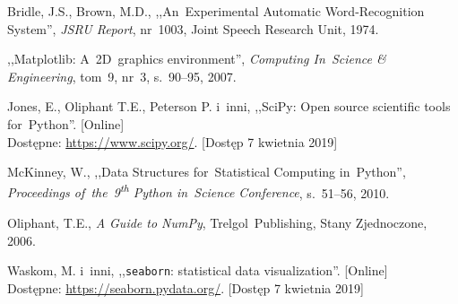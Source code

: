 \documentclass[11pt,a4paper]{article}
\begin{document}
\begin{thebibliography}{9}

        Bridle, J.S.,
        Brown, M.D.,
        ,,An~Experimental Automatic Word-Recognition System'',
        \emph{JSRU Report},
        nr~1003,
        Joint Speech Research Unit,
        1974.

        ,,Matplotlib: A~2D~graphics environment'',
        \emph{Computing In~Science \& Engineering},
        tom~9,
        nr~3,
        s.~90--95,
        2007.

        Jones, E., Oliphant T.E., Peterson P. i~inni,
        ,,SciPy: Open source scientific tools for~Python''.
        [Online]
        \\
        Dostępne: \url{https://www.scipy.org/}.
        [Dostęp 7 kwietnia 2019]

        McKinney, W.,
        ,,Data Structures for~Statistical Computing in~Python'',
        \emph{Proceedings of~the~9\textsuperscript{th} Python in~Science Conference},
        s.~51--56,
        2010.

        Oliphant, T.E.,
        \emph{A Guide to NumPy},
        Trelgol~Publishing,
        Stany Zjednoczone,
        2006.

        Waskom, M. i~inni,
        ,,\texttt{seaborn}: statistical data visualization''.
        [Online]
        \\
        Dostępne: \url{https://seaborn.pydata.org/}.
        [Dostęp 7 kwietnia 2019]


\end{thebibliography}
\end{document}
